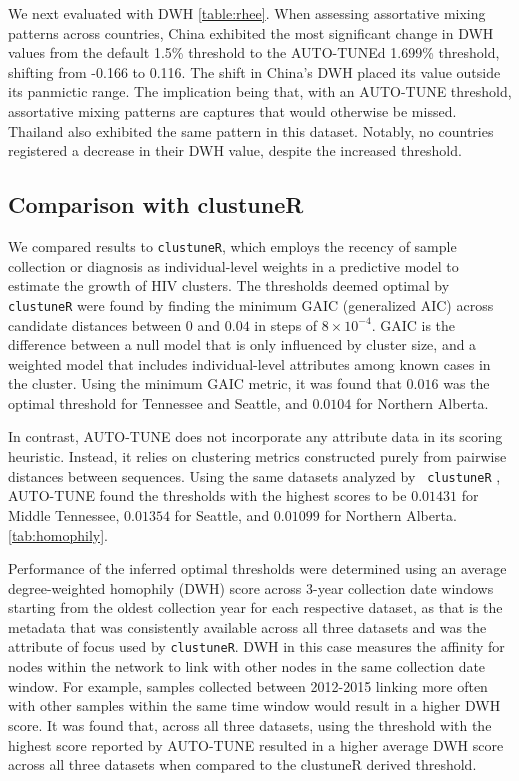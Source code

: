 \documentclass[utf8]{FrontiersinHarvard} %
\newcommand{\TODO}[1]{{\color{red}{#1}}}
\begin{document}
We next evaluated \citep{rhee_national_2019} with DWH \ref{table:rhee}. When
assessing assortative mixing patterns across countries, China exhibited the
most significant change in DWH values from the default 1.5\% threshold to the
AUTO-TUNEd 1.699\% threshold, shifting from -0.166 to 0.116. The shift in
China's DWH placed its value outside its panmictic range. The implication being
that, with an AUTO-TUNE threshold, assortative mixing patterns are captures
that would otherwise be missed. Thailand also exhibited the same pattern in
this dataset. Notably, no countries registered a decrease in their DWH value,
despite the increased threshold.
\label{fig:scoreAbove2}



\subsection{Comparison with clustuneR}

We compared results to {\tt clustuneR}, which employs the recency of sample
collection or diagnosis as individual-level weights in a predictive model to
estimate the growth of HIV clusters. The thresholds deemed optimal by {\tt
		clustuneR} were found by finding the minimum GAIC (generalized AIC) across
candidate distances between $0$ and $0.04$ in steps of $8 \times 10^{-4}$. GAIC
is the difference between a null model that is only influenced by cluster size,
and a weighted model that includes individual-level attributes among known
cases in the cluster. Using the minimum GAIC metric, it was found that $0.016$
was the optimal threshold for Tennessee and Seattle, and $0.0104$ for Northern
Alberta.

In contrast, AUTO-TUNE does not incorporate any attribute data in its scoring
heuristic. Instead, it relies on clustering metrics constructed purely from
pairwise distances between sequences. Using the same datasets analyzed by {\tt
		clustuneR} \citep{chato_public_2020}, AUTO-TUNE found the thresholds with the
highest scores to be $0.01431$ for Middle Tennessee, $0.01354$ for Seattle, and
$0.01099$ for Northern Alberta. \autoref{tab:homophily}. 

\TODO{discuss how our thresholds perform vs the published thresholds; look at the GAIC plots}
\TODO{Add performance metrics}

Performance of the inferred optimal thresholds were determined using an average
degree-weighted homophily (DWH) score across 3-year collection date windows
starting from the oldest collection year for each respective dataset, as that
is the metadata that was consistently available across all three datasets and
was the attribute of focus used by {\tt clustuneR}. DWH in this case measures
the affinity for nodes within the network to link with other nodes in the same
collection date window. For example, samples collected between 2012-2015
linking more often with other samples within the same time window would result
in a higher DWH score. It was found that, across all three datasets, using the
threshold with the highest score reported by AUTO-TUNE resulted in a higher
average DWH score across all three datasets when compared to the clustuneR
derived threshold. 
\end{document}
